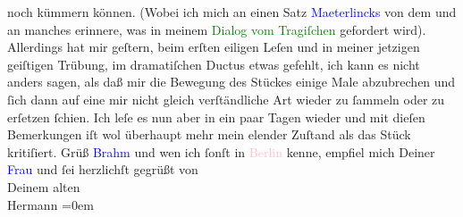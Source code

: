               noch kümmern können. (Wobei ich mich an einen Satz \textcolor{blue}{Maeterlincks}{}\ledrightnote{\textcolor{blue}{Maurice Maeterlinck}} von dem \label{K_L01367_1v}\label{K_L01367_1h} und an manches erinnere, was in meinem \textcolor{green}{Dialog vom Tragiſchen}{}\ledrightnote{\textcolor{green}{Dialog vom Tragischen}} gefordert wird). Allerdings {\pb}hat mir geſtern, beim erſten eiligen Leſen und in
               meiner jetzigen geiſtigen Trübung, im dramatiſchen Ductus etwas gefehlt, ich kann es
               nicht anders sagen, als daß mir die Bewegung des Stückes einige Male abzubrechen und
               ſich dann auf eine mir nicht gleich verſtändliche Art wieder zu ſammeln oder zu
               erſetzen ſchien. Ich leſe es nun aber in ein paar Tagen wieder und mit dieſen
               Bemerkungen iſt wol überhaupt mehr mein elender Zuſtand als das Stück kritiſiert.\pend
           \pstart
           Grüß \textcolor{blue}{Brahm}{}\ledrightnote{\textcolor{blue}{Otto Brahm}} und wen ich ſonſt in \textcolor{pink}{Berlin}{}\ledrightnote{\textcolor{pink}{Berlin}} kenne, empfiel mich Deiner \textcolor{blue}{Frau}{} und ſei herzlichſt gegrüßt
               von{\\[\baselineskip]}Deinem alten{\\[\baselineskip]}\spacefill\mbox{Hermann}\pend
           \leftskip=0em{}\endnumbering{}  
      